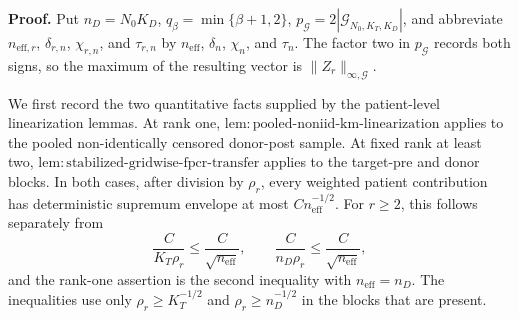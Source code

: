 \textbf{Proof.}
Put \(n_D=N_0K_D\), \(q_\beta=\min\{\beta+1,2\}\),
\(p_{\mathcal G}=2|\mathcal G_{N_0,K_T,K_D}|\), and abbreviate
\(n_{\mathrm{eff},r}\), \(\delta_{r,n}\), \(\chi_{r,n}\), and
\(\tau_{r,n}\) by \(n_{\mathrm{eff}}\), \(\delta_n\), \(\chi_n\), and
\(\tau_n\).  The factor two in \(p_{\mathcal G}\) records both signs, so the
maximum of the resulting vector is \(\|Z_r\|_{\infty,\mathcal G}\).

We first record the two quantitative facts supplied by the patient-level
linearization lemmas.  At rank one,
\(\mathrm{lem:pooled\mbox{-}noniid\mbox{-}km\mbox{-}linearization}\) applies to
the pooled non-identically censored donor-post sample.  At fixed rank at least
two,
\(\mathrm{lem:stabilized\mbox{-}gridwise\mbox{-}fpcr\mbox{-}transfer}\)
applies to the target-pre and donor blocks.  In both cases, after division by
\(\rho_r\), every weighted patient contribution has deterministic supremum
envelope at most \(C n_{\mathrm{eff}}^{-1/2}\).  For \(r\ge2\), this follows
separately from
\[
 \frac{C}{K_T\rho_r}\le \frac{C}{\sqrt{n_{\mathrm{eff}}}},
 \qquad
 \frac{C}{n_D\rho_r}\le \frac{C}{\sqrt{n_{\mathrm{eff}}}},             \tag{1}
\]
and the rank-one assertion is the second inequality with
\(n_{\mathrm{eff}}=n_D\).  The inequalities use only
\(\rho_r\ge K_T^{-1/2}\) and \(\rho_r\ge n_D^{-1/2}\) in the blocks that
are present.

